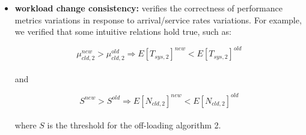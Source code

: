 \begin{itemize}
	\item \textbf{workload change consistency:} verifies the correctness of performance metrics variations in response to arrival/service rates variations. For example, we verified that some intuitive relations hold true, such as:
	
	\begin{equation}
		\mu_{cld,2}^{new} > \mu_{cld,2}^{old} \Rightarrow E[T_{sys,2}]^{new} < E[T_{sys,2}]^{old}
	\end{equation}
	\\
	and
	
	\begin{equation}
	S^{new} > S^{old} \Rightarrow E[N_{cld,2}]^{new} < E[N_{cld,2}]^{old}
	\end{equation}
	\\
	where $S$ is the threshold for the off-loading algorithm 2.
\end{itemize}